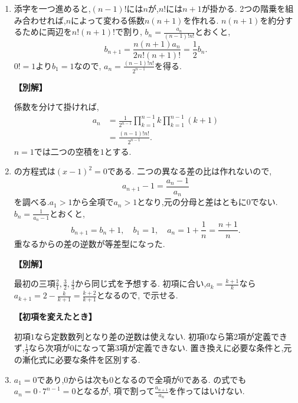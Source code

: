 \begin{enumerate}[label=\textbf{問\arabic*.},leftmargin=3.8em,format=\bookitemlink{practice-basic}{solution}{problem}]
  \item {}\BookMathLayout{}{\\}
    添字を一つ進めると,$(n-1)!$には$n$が,$n!$には$n+1$が掛かる.
    2つの階乗を組み合わせれば,$n$によって変わる係数$n(n+1)$を作れる.
    $n(n+1)$を約分するために両辺を$n!(n+1)!$で割り,\BookMathLayout{}{\\}%
    $b_n=\frac{a_n}{(n-1)!n!}$とおくと,
    \[
      b_{n+1}=\frac{n(n+1)a_n}{2n!(n+1)!}
      =\frac12b_n.
    \]
    $0!=1$より$b_1=1$なので,\BookMathLayout{}{\\}%
    $a_n=\frac{(n-1)!n!}{2^{n-1}}$を得る.
    \par\smallskip\noindent\textbf{【別解】}\par
    係数を分けて掛ければ,
    \[
      \begin{aligned}
        a_n&=\frac1{2^{n-1}}\prod_{k=1}^{n-1}k
        \prod_{k=1}^{n-1}(k+1)\\
        &=\frac{(n-1)!n!}{2^{n-1}}.
      \end{aligned}
    \]
    $n=1$では二つの空積を$1$とする.

  \item {}\BookMathLayout{}{\\}
    の方程式は$(x-1)^2=0$である.
    二つの異なる差の比は作れないので,
    \[
      a_{n+1}-1=\frac{a_n-1}{a_n}
    \]
    を調べる.$a_1>1$から全項で$a_n>1$となり,元の分母と差はともに0でない.
    $b_n=\frac{1}{a_n-1}$とおくと,
    \[
      b_{n+1}=b_n+1,\quad b_1=1,
      \quad a_n=1+\frac1n=\frac{n+1}n.
    \]
    重なるからの差の逆数が等差型になった.
    \par\smallskip\noindent\textbf{【別解】}\par
    最初の三項$\frac{2}{1},\frac{3}{2},\frac{4}{3}$から同じ式を予想する.
    初項に合い,$a_k=\frac{k+1}{k}$なら$a_{k+1}=2-\frac{k}{k+1}=\frac{k+2}{k+1}$となるので,
    で示せる.
    \par\smallskip\noindent\textbf{【初項を変えたとき】}\par\nopagebreak[4]
    初項$1$なら定数数列となり差の逆数は使えない.
    初項$0$なら第2項が定義できず,$\frac{1}{2}$なら次項が$0$になって第3項が定義できない.
    置き換えに必要な条件と,元の漸化式に必要な条件を区別する.

  \item {}\BookMathLayout{}{\\}
    $a_1=0$であり,$0$からは次も$0$となるので全項が$0$である.
    の式でも$a_n=0\cdot7^{n-1}=0$となるが,
    項で割って$\frac{a_{n+1}}{a_n}$を作ってはいけない.


\end{enumerate}
